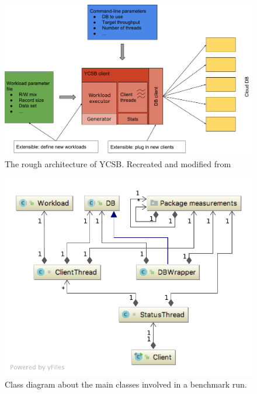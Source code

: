 \begin{figure}
  \centering
  \includegraphics[width=\textwidth]{images/benchmarks/ycsbArchitecture}
  \caption{The rough architecture of YCSB. Recreated and modified from~\cite[25]{Abubakar2014}}
  \label{fig:ycsbArchitecture}
\end{figure}

\begin{figure}
  \centering
  \includegraphics[width=\textwidth]{images/benchmarks/basicYCSBWorkflow}
  \caption{Class diagram about the main classes involved in a benchmark run.}
  \label{fig:basicYCSBWorkflow}
\end{figure}
